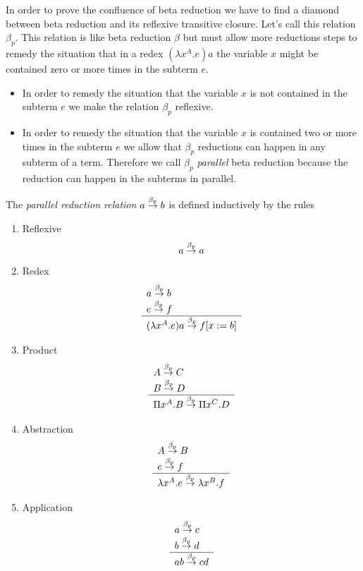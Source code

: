 In order to prove the confluence of beta reduction we have to find a diamond
between beta reduction and its reflexive transitive closure. Let's call this
relation $\beta_p$. This relation is like beta reduction $\beta$ but must allow
more reductions steps to remedy the situation that in a redex $(\lambda x^A.e)a$
the variable $x$ might be contained zero or more times in the subterm $e$.

\begin{itemize}
    \item In order to remedy the situation that the variable $x$ is not
        contained in the subterm $e$ we make the relation $\beta_p$ reflexive.

    \item In order to remedy the situation that the variable $x$ is contained
        two or more times in the subterm $e$ we allow that $\beta_p$ reductions
        can happen in any subterm of a term. Therefore we call $\beta_p$
        \emph{parallel} beta reduction because the reduction can happen in the
        subterms in parallel.
\end{itemize}


\begin{definition}
    The \emph{parallel reduction relation} $a \stackrel{\beta_p}{\to} b$ is defined inductively
    by the rules
    \begin{enumerate}
    \item Reflexive
    $$
        a \stackrel{\beta_p}{\to} a
    $$

    \item Redex
    $$
        \begin{array}{l} 
            a \stackrel{\beta_p}{\to} b
            \\
            e \stackrel{\beta_p}{\to} f
         \\ \hline 
            (\lambda x^A. e) a \stackrel{\beta_p}{\to} f[x:=b]
        \end{array}
    $$

    \item Product
    $$
    \begin{array}{l} 
        A \stackrel{\beta_p}{\to} C
        \\
        B \stackrel{\beta_p}{\to} D
     \\ \hline 
        \Pi x^A. B \stackrel{\beta_p}{\to} \Pi x^C. D
    \end{array}
    $$

    \item Abstraction
    $$
    \begin{array}{l} 
        A \stackrel{\beta_p}{\to} B
        \\
        e \stackrel{\beta_p}{\to} f
     \\ \hline 
        \lambda x^A. e \stackrel{\beta_p}{\to} \lambda x^B. f
    \end{array}
    $$

    \item Application
    $$
    \begin{array}{l} 
        a \stackrel{\beta_p}{\to} c
        \\
        b \stackrel{\beta_p}{\to} d
     \\ \hline 
        a b \stackrel{\beta_p}{\to} c d
    \end{array}
    $$
    \end{enumerate}
\end{definition}


